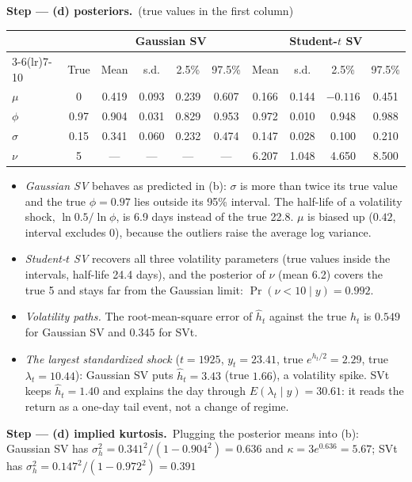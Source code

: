 \documentclass[11pt,a4paper]{article}
\newcommand{\passo}[2]{\par\smallskip\noindent\textbf{Step --- #1.}~#2}
\begin{document}
\begin{sol}
\passo{(d) posteriors}{(true values in the first column)}
\begin{center}\small
\begin{tabular}{lc cccc cccc}
\toprule
 & & \multicolumn{4}{c}{Gaussian SV} & \multicolumn{4}{c}{Student-$t$ SV}\\
\cmidrule(lr){3-6}\cmidrule(lr){7-10}
 & True & Mean & s.d. & 2.5\% & 97.5\% & Mean & s.d. & 2.5\% & 97.5\%\\
\midrule
$\mu$ & 0 & 0.419 & 0.093 & 0.239 & 0.607 & 0.166 & 0.144 & $-0.116$ & 0.451\\
$\phi$ & 0.97 & 0.904 & 0.031 & 0.829 & 0.953 & 0.972 & 0.010 & 0.948 & 0.988\\
$\sigma$ & 0.15 & 0.341 & 0.060 & 0.232 & 0.474 & 0.147 & 0.028 & 0.100 & 0.210\\
$\nu$ & 5 & --- & --- & --- & --- & 6.207 & 1.048 & 4.650 & 8.500\\
\bottomrule
\end{tabular}
\end{center}
\begin{itemize}[leftmargin=1.4em]
\item \textit{Gaussian SV} behaves as predicted in (b): $\sigma$ is more than twice its true value and the true
$\phi=0.97$ lies outside its 95\% interval. The half-life of a volatility shock, $\ln0.5/\ln\phi$, is 6.9 days
instead of the true 22.8. $\mu$ is biased up ($0.42$, interval excludes 0), because the outliers raise the average log variance.
\item \textit{Student-$t$ SV} recovers all three volatility parameters (true values inside the intervals,
half-life 24.4 days), and the posterior of $\nu$ (mean 6.2) covers the true 5 and stays far from the Gaussian limit:
$\Pr(\nu<10\mid y)=0.992$.
\item \textit{Volatility paths.} The root-mean-square error of $\hat h_t$ against the true $h_t$ is
$0.549$ for Gaussian SV and $0.345$ for SVt.
\item \textit{The largest standardized shock} ($t=1925$, $y_t=23.41$, true $e^{h_t/2}=2.29$, true $\lambda_t=10.44$):
Gaussian SV puts $\hat h_t=3.43$ (true $1.66$), a volatility spike. SVt keeps $\hat h_t=1.40$ and explains the day
through $E(\lambda_t\mid y)=30.61$: it reads the return as a one-day tail event, not a change of regime.
\end{itemize}
\passo{(d) implied kurtosis}{Plugging the posterior means into (b): Gaussian SV has
$\sigma_h^2=0.341^2/(1-0.904^2)=0.636$ and $\kappa=3e^{0.636}=5.67$; SVt has $\sigma_h^2=0.147^2/(1-0.972^2)=0.391$
}
\end{sol}
\end{document}
